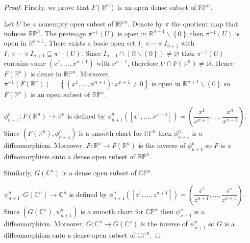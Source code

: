\begin{proof}
    Firstly, we prove that \( F(\mathbb{R}^{n}) \) is an open dense subset of \( \mathbb{RP}^{n} \).

    Let \( U \) be a nonempty open subset of \( \mathbb{RP}^{n} \). Denote by \( \pi \) the quotient map that induces \( \mathbb{RP}^{n} \). The preimage \( \pi^{-1}(U) \) is open in \( \mathbb{R}^{n+1} \smallsetminus \left\{ 0 \right\} \) then \( \pi^{-1}(U) \) is open in \( \mathbb{R}^{n+1} \). There exists a basic open set \( I_{1} \times \cdots \times I_{n+1} \) with \( I_{1} \times \cdots \times I_{n+1} \subseteq \pi^{-1}(U) \). Since \( I_{n+1} \cap (\mathbb{R} \smallsetminus \left\{ 0 \right\}) \ne \varnothing \) then \( \pi^{-1}(U) \) contains some \( (x^{1}, \ldots, x^{n+1}) \) with \( x^{n+1} \), therefore \( U \cap F(\mathbb{R}^{n}) \ne \varnothing \). Hence \( F(\mathbb{R}^{n}) \) is dense in \( \mathbb{RP}^{n} \). Moreover, \( \pi^{-1}(F(\mathbb{R}^{n})) = \left\{ (x^{1}, \ldots, x^{n+1}): x^{n+1} \ne 0 \right\} \) is open in \( \mathbb{R}^{n+1} \smallsetminus \left\{ 0 \right\} \) so \( F(\mathbb{R}^{n}) \) is an open subset of \( \mathbb{RP}^{n} \).

    \( \phi_{n+1}^{n}: F(\mathbb{R}^{n}) \to \mathbb{R}^{n} \) is defined by \( \phi_{n+1}^{n}([x^{1}, \ldots, x^{n+1}]) = \left( \dfrac{x^{1}}{x^{n+1}}, \ldots, \dfrac{x^{n}}{x^{n+1}} \right) \). Since \( (F(\mathbb{R}^{n}), \phi_{n+1}^{n}) \) is a smooth chart for \( \mathbb{RP}^{n} \) then \( \phi_{n+1}^{n} \) is a diffeomorphism. Moreover, \( F: \mathbb{R}^{n} \to F(\mathbb{R}^{n}) \) is the inverse of \( \phi_{n+1}^{n} \) so \( F \) is a diffeomorphism onto a dense open subset of \( \mathbb{RP}^{n} \).

    Similarly, \( G(\mathbb{C}^{n}) \) is a dense open subset of \( \mathbb{CP}^{n} \).

    \( \psi_{n+1}^{n}: G(\mathbb{C}^{n}) \to \mathbb{C}^{n} \) is defined by \( \phi_{n+1}^{n}([z^{1}, \ldots, z^{n+1}]) = \left( \dfrac{z^{1}}{z^{n+1}}, \ldots, \dfrac{z^{n}}{z^{n+1}} \right) \). Since \( (G(\mathbb{C}^{n}), \psi_{n+1}^{n}) \) is a smooth chart for \( \mathbb{CP}^{n} \) then \( \psi_{n+1}^{n} \) is a diffeomorphism. Moreover, \( G: \mathbb{C}^{n} \to G(\mathbb{C}^{n}) \) is the inverse of \( \psi_{n+1}^{n} \) so \( G \) is a diffeomorphism onto a dense open subset of \( \mathbb{CP}^{n} \).
\end{proof}

